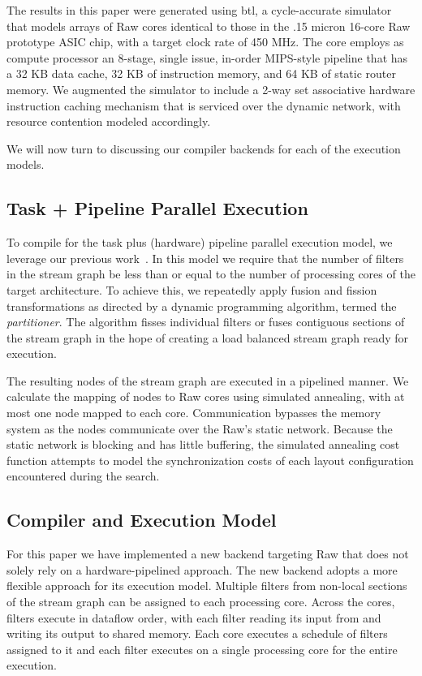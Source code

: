 The results in this paper were generated using btl, a cycle-accurate
simulator that models arrays of Raw cores identical to those in the
.15 micron 16-core Raw prototype ASIC chip, with a target clock rate
of 450 MHz. The core employs as compute processor an 8-stage, single
issue, in-order MIPS-style pipeline that has a 32 KB data cache, 32 KB
of instruction memory, and 64 KB of static router memory.  We
augmented the simulator to include a 2-way set associative hardware
instruction caching mechanism that is serviced over the dynamic
network, with resource contention modeled accordingly. 

We will now turn to discussing our compiler backends for each of the
execution models.

\subsection{Task + Pipeline Parallel Execution}
\label{sec:space-imp}
To compile for the task plus (hardware) pipeline parallel execution
model, we leverage our previous work~\cite{streamit-asplos}.  In this
model we require that the number of filters in the stream graph be
less than or equal to the number of processing cores of the target
architecture.  To achieve this, we repeatedly apply fusion and fission
transformations as directed by a dynamic programming algorithm, termed
the {\it partitioner}.  The algorithm fisses individual filters or
fuses contiguous sections of the stream graph in the hope of creating
a load balanced stream graph ready for execution.

The resulting nodes of the stream graph are executed in a pipelined
manner.  We calculate the mapping of nodes to Raw cores using
simulated annealing, with at most one node mapped to each core.
Communication bypasses the memory system as the nodes communicate over
the Raw's static network.  Because the static network is blocking and
has little buffering, the simulated annealing cost function attempts
to model the synchronization costs of each layout configuration
encountered during the search.

\subsection{Compiler and Execution Model}
For this paper we have implemented a new backend targeting Raw that
does not solely rely on a hardware-pipelined approach.  The new
backend adopts a more flexible approach for its execution model.
Multiple filters from non-local sections of the stream graph can be
assigned to each processing core.  Across the cores, filters execute
in dataflow order, with each filter reading its input from and writing
its output to shared memory. Each core executes a schedule of filters
assigned to it and each filter executes on a single processing core
for the entire execution.

